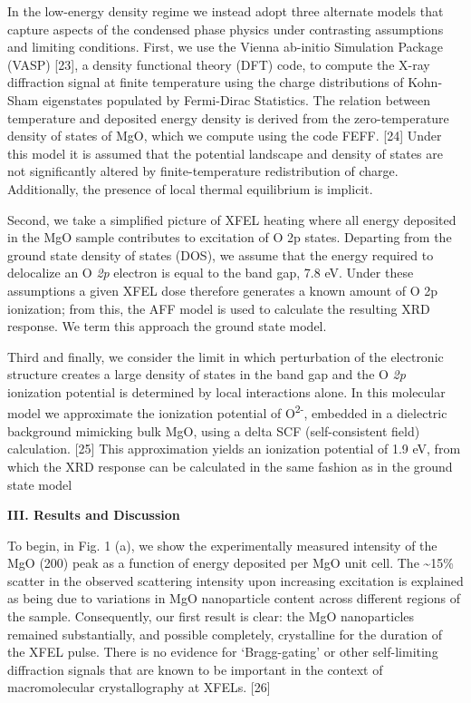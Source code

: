 In the low-energy density regime we instead adopt three alternate models
that capture aspects of the condensed phase physics under contrasting
assumptions and limiting conditions. First, we use the Vienna ab-initio
Simulation Package (VASP) {[}23{]}, a density functional theory (DFT)
code, to compute the X-ray diffraction signal at finite temperature
using the charge distributions of Kohn-Sham eigenstates populated by
Fermi-Dirac Statistics. The relation between temperature and deposited
energy density is derived from the zero-temperature density of states of
MgO, which we compute using the code FEFF. {[}24{]} Under this model it
is assumed that the potential landscape and density of states are not
significantly altered by finite-temperature redistribution of charge.
Additionally, the presence of local thermal equilibrium is implicit.

Second, we take a simplified picture of XFEL heating where all energy
deposited in the MgO sample contributes to excitation of O 2p states.
Departing from the ground state density of states (DOS), we assume that
the energy required to delocalize an O \emph{2p} electron is equal to
the band gap, 7.8 eV. Under these assumptions a given XFEL dose
therefore generates a known amount of O 2p ionization; from this, the
AFF model is used to calculate the resulting XRD response. We term this
approach the ground state model.

Third and finally, we consider the limit in which perturbation of the
electronic structure creates a large density of states in the band gap
and the O \emph{2p} ionization potential is determined by local
interactions alone. In this molecular model we approximate the
ionization potential of O\textsuperscript{2-}, embedded in a dielectric
background mimicking bulk MgO, using a delta SCF (self-consistent field)
calculation. {[}25{]} This approximation yields an ionization potential
of 1.9 eV, from which the XRD response can be calculated in the same
fashion as in the ground state model

\textbf{III. Results and Discussion}

To begin, in Fig. 1 (a), we show the experimentally measured intensity
of the MgO (200) peak as a function of energy deposited per MgO unit
cell. The \textasciitilde{}15\% scatter in the observed scattering
intensity upon increasing excitation is explained as being due to
variations in MgO nanoparticle content across different regions of the
sample. Consequently, our first result is clear: the MgO nanoparticles
remained substantially, and possible completely, crystalline for the
duration of the XFEL pulse. There is no evidence for `Bragg-gating' or
other self-limiting diffraction signals that are known to be important
in the context of macromolecular crystallography at XFELs. {[}26{]}

